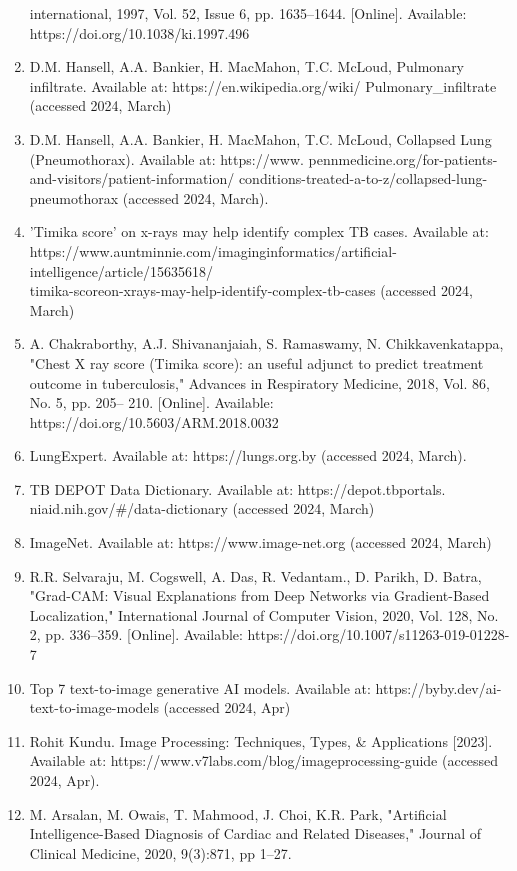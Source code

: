 \documentclass[a4paper]{article}
\begin{document}
\begin{multicols}{2}
\begin{enumerate}
international, 1997, Vol. 52, Issue 6, pp. 1635–1644. [Online].
Available: https://doi.org/10.1038/ki.1997.496
    \item D.M. Hansell, A.A. Bankier, H. MacMahon, T.C. McLoud, Pulmonary infiltrate. Available at: https://en.wikipedia.org/wiki/
Pulmonary\_infiltrate (accessed 2024, March)
    \item D.M. Hansell, A.A. Bankier, H. MacMahon, T.C. McLoud, Collapsed Lung (Pneumothorax). Available at: https://www.
pennmedicine.org/for-patients-and-visitors/patient-information/
conditions-treated-a-to-z/collapsed-lung-pneumothorax
(accessed 2024, March).
    \item ’Timika score’ on x-rays may help identify complex TB
cases. Available at: https://www.auntminnie.com/imag\-inginformatics/artificial-intelligence/article/15635618/\\timika-scoreon-xrays-may-help-identify-complex-tb-cases (accessed 2024,
March)
    \item A. Chakraborthy, A.J. Shivananjaiah, S. Ramaswamy,
N. Chikkavenkatappa, "Chest X ray score (Timika score):
an useful adjunct to predict treatment outcome in tuberculosis,"
Advances in Respiratory Medicine, 2018, Vol. 86, No. 5, pp. 205–
210. [Online]. Available: https://doi.org/10.5603/ARM.2018.0032
    \item LungExpert. Available at: https://lungs.org.by (accessed 2024,
March).
    \item TB DEPOT Data Dictionary. Available at: https://depot.tbportals.
niaid.nih.gov/#/data-dictionary (accessed 2024, March)
    \item ImageNet. Available at: https://www.image-net.org (accessed
2024, March)
    \item R.R. Selvaraju, M. Cogswell, A. Das, R. Vedantam., D. Parikh,
D. Batra, "Grad-CAM: Visual Explanations from Deep Networks
via Gradient-Based Localization," International Journal of Computer Vision, 2020, Vol. 128, No. 2, pp. 336–359. [Online].
Available: https://doi.org/10.1007/s11263-019-01228-7
    \item Top 7 text-to-image generative AI models. Available at:
https://byby.dev/ai-text-to-image-models (accessed 2024, Apr)
    \item Rohit Kundu. Image Processing: Techniques, Types, \& Applications [2023]. Available at: https://www.v7labs.com/blog/imageprocessing-guide (accessed 2024, Apr).
    \item M. Arsalan, M. Owais, T. Mahmood, J. Choi, K.R. Park, "Artificial Intelligence-Based Diagnosis of Cardiac and Related Diseases," Journal of Clinical Medicine, 2020, 9(3):871, pp 1–27.

\end{enumerate}
\end{multicols}
\end{document}

